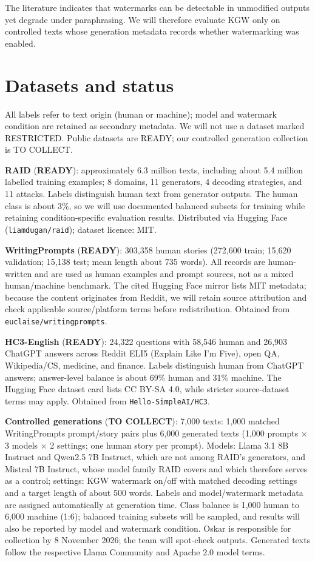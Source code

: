 \documentclass[11pt]{article}
\begin{document}
The literature indicates that watermarks can be detectable in unmodified outputs yet degrade under paraphrasing. We will therefore evaluate KGW only on controlled texts whose generation metadata records whether watermarking was enabled.

\section{Datasets and status}
All labels refer to text origin (human or machine); model and watermark condition are retained as secondary metadata. We will not use a dataset marked RESTRICTED. Public datasets are READY; our controlled generation collection is TO COLLECT.

\noindent\textbf{RAID} \cite{dugan2024raid} (\textbf{READY}): approximately 6.3 million texts, including about 5.4 million labelled training examples; 8 domains, 11 generators, 4 decoding strategies, and 11 attacks. Labels distinguish human text from generator outputs. The human class is about 3\%, so we will use documented balanced subsets for training while retaining condition-specific evaluation results. Distributed via Hugging Face (\texttt{liamdugan/raid}); dataset licence: MIT.

\noindent\textbf{WritingPrompts} \cite{fan2018hierarchical} (\textbf{READY}): 303,358 human stories (272,600 train; 15,620 validation; 15,138 test; mean length about 735 words). All records are human-written and are used as human examples and prompt sources, not as a mixed human/machine benchmark. The cited Hugging Face mirror lists MIT metadata; because the content originates from Reddit, we will retain source attribution and check applicable source/platform terms before redistribution. Obtained from \texttt{euclaise/writingprompts}.

\noindent\textbf{HC3-English} \cite{guo2023hc3} (\textbf{READY}): 24,322 questions with 58,546 human and 26,903 ChatGPT answers across Reddit ELI5 (Explain Like I'm Five), open QA, Wikipedia/CS, medicine, and finance. Labels distinguish human from ChatGPT answers; answer-level balance is about 69\% human and 31\% machine. The Hugging Face dataset card lists CC BY-SA 4.0, while stricter source-dataset terms may apply. Obtained from \texttt{Hello-SimpleAI/HC3}.

\noindent\textbf{Controlled generations} (\textbf{TO COLLECT}): 7,000 texts: 1,000 matched WritingPrompts prompt/story pairs plus 6,000 generated texts (1,000 prompts $\times$ 3 models $\times$ 2 settings; one human story per prompt). Models: Llama 3.1 8B Instruct and Qwen2.5 7B Instruct, which are not among RAID's generators, and Mistral 7B Instruct, whose model family RAID covers and which therefore serves as a control; settings: KGW watermark on/off with matched decoding settings and a target length of about 500 words. Labels and model/watermark metadata are assigned automatically at generation time. Class balance is 1,000 human to 6,000 machine (1:6); balanced training subsets will be sampled, and results will also be reported by model and watermark condition. Oskar is responsible for collection by 8 November 2026; the team will spot-check outputs. Generated texts follow the respective Llama Community and Apache 2.0 model terms.
\end{document}
